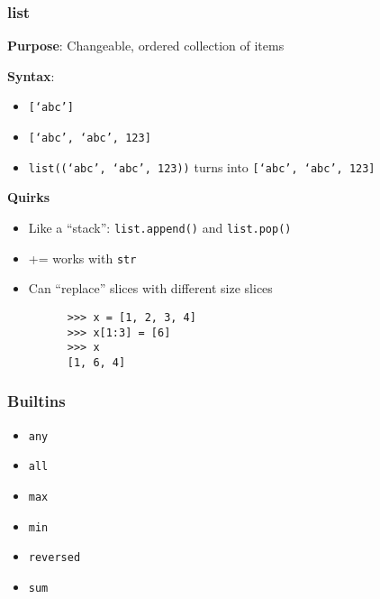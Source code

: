 \documentclass{beamer}
\begin{document}
\begin{frame}[fragile]
  \frametitle{list}

   \textbf{Purpose}: Changeable, ordered collection of items

   \textbf{Syntax}: 
   \begin{itemize}
     \item \texttt{[`abc']} 
     \item \texttt{[`abc', `abc', 123]}
     \item \texttt{list((`abc', `abc', 123))} turns into \texttt{[`abc', `abc', 123]}
   \end{itemize}

  \textbf{Quirks}
  \begin{itemize}
    \item Like a ``stack'': \texttt{list.append()} and \texttt{list.pop()}
    \item += works with \texttt{str}
    \item Can ``replace'' slices with different size slices 
    \begin{lstlisting}
      >>> x = [1, 2, 3, 4]
      >>> x[1:3] = [6]
      >>> x
      [1, 6, 4]
    \end{lstlisting}
  \end{itemize}
\end{frame}

\begin{frame}
  \frametitle{Builtins}

  \begin{itemize}
    \item \texttt{any}
    \item \texttt{all}
    \item \texttt{max}
    \item \texttt{min}
    \item \texttt{reversed}
    \item \texttt{sum}
  \end{itemize}
\end{frame}
\end{document}
